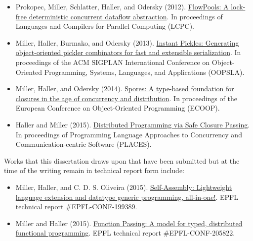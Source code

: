 \begin{itemize}

	\item Prokopec, Miller, Schlatter, Haller, and Odersky (2012).
	\href{http://infoscience.epfl.ch/record/180265}{FlowPools: A lock-free
	deterministic concurrent dataflow abstraction}. In proceedings of Languages and
	Compilers for Parallel Computing (LCPC).

	\item Miller, Haller, Burmako, and Odersky (2013).
	\href{http://infoscience.epfl.ch/record/188383}{Instant Pickles: Generating
	object-oriented pickler combinators for fast and extensible serialization}. In proceedings of the ACM SIGPLAN International Conference on Object-Oriented Programming, Systems, Languages, and Applications (OOPSLA).

	\item Miller, Haller, and Odersky (2014).
	\href{http://infoscience.epfl.ch/record/191239}{Spores: A type-based
	foundation for closures in the age of concurrency and distribution}. In
	proceedings of the European Conference on Object-Oriented Programming (ECOOP).

	\item Haller and Miller (2015).
	\href{https://infoscience.epfl.ch/record/205039}{Distributed Programming
	via Safe Closure Passing}. In proceedings of Programming Language Approaches to
	Concurrency and Communication-centric Software (PLACES).

\end{itemize}

Works that this dissertation draws upon that have been submitted but at the time
of the writing remain in technical report form include:

\begin{itemize}

	\item Miller, Haller, and C. D. S. Oliveira (2015). \href{http://infoscience.epfl.ch/record/199389}{Self-Assembly: Lightweight language extension and datatype generic programming, all-in-one!}. EPFL technical report \#EPFL-CONF-199389.

	\item Miller and Haller (2015).
	\href{http://infoscience.epfl.ch/record/205822}{Function Passing: A model for
	typed, distributed functional programming}. EPFL technical report
	\#EPFL-CONF-205822.

\end{itemize}
